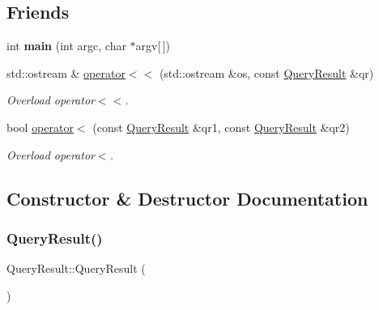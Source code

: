 \subsection*{Friends}
\begin{DoxyCompactItemize}
\item 
\mbox{\label{class_query_result_a0ddf1224851353fc92bfbff6f499fa97}} 
int {\bfseries main} (int argc, char $\ast$argv\mbox{[}$\,$\mbox{]})
\item 
std\+::ostream \& \hyperlink{class_query_result_a860145488e9a3cd6c7df13816dd3f78e}{operator$<$$<$} (std\+::ostream \&os, const \hyperlink{class_query_result}{Query\+Result} \&qr)
\begin{DoxyCompactList}\small\item\em Overload operator$<$$<$. \end{DoxyCompactList}\item 
bool \hyperlink{class_query_result_a818370d36ae89f51264a7701543884bd}{operator$<$} (const \hyperlink{class_query_result}{Query\+Result} \&qr1, const \hyperlink{class_query_result}{Query\+Result} \&qr2)
\begin{DoxyCompactList}\small\item\em Overload operator$<$. \end{DoxyCompactList}\end{DoxyCompactItemize}


\subsection{Constructor \& Destructor Documentation}
\mbox{\label{class_query_result_a23c0f8433d60025e81759f569dc08ab8}} 
\subsubsection{\texorpdfstring{Query\+Result()}{QueryResult()}\hspace{0.1cm}{\footnotesize\ttfamily [1/3]}}
{\footnotesize\ttfamily Query\+Result\+::\+Query\+Result (\begin{DoxyParamCaption}{ }\end{DoxyParamCaption})\hspace{0.3cm}{\ttfamily [inline]}}



